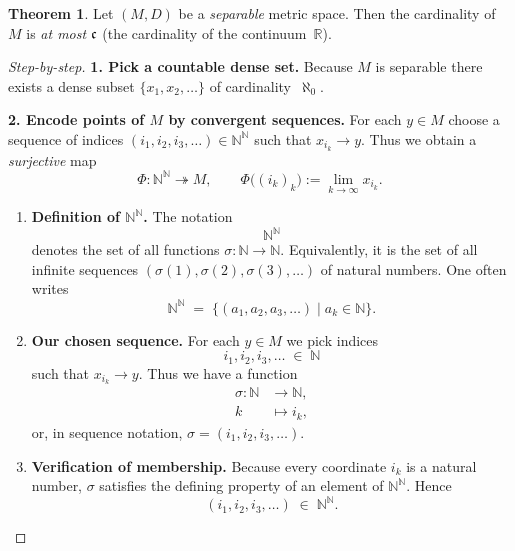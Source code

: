 \documentclass[12pt]{article}
\theoremstyle{definition} %
\newtheorem{theorem}{Theorem}
\theoremstyle{plain} %
\begin{document}
\begin{theorem}\label{thm:card_separable}
  Let $(M,D)$ be a \emph{separable} metric space.
  Then the cardinality of $M$ is \emph{at most} $\frak c$
  (the cardinality of the continuum~$\mathbb R$).
\end{theorem}

\begin{proof}[Step-by-step]
  \textbf{1.  Pick a countable dense set.}\;
  Because $M$ is separable there exists a dense subset
  $\{x_1,x_2,\dots\}$ of cardinality~$\aleph_0$.

  \medskip
  \textbf{2.  Encode points of $M$ by convergent sequences.}\;
  For each $y\in M$ choose a sequence of indices
  $(i_1,i_2,i_3,\dots)\in\mathbb N^{\mathbb N}$ such that
  $x_{i_k}\to y$.
  Thus we obtain a \emph{surjective} map
  \[
      \Phi:\mathbb N^{\mathbb N}\twoheadrightarrow M,
      \qquad
      \Phi\bigl((i_k)_{k}\bigr):=\lim_{k\to\infty}x_{i_k}.
  \]

\begin{enumerate}
  \item \textbf{Definition of \(\mathbb N^{\mathbb N}\).}  
        The notation 
        \[
             \mathbb N^{\mathbb N}
        \]
        denotes the set of all functions
        \(\sigma:\mathbb N\longrightarrow\mathbb N\).  
        Equivalently, it is the set of all infinite sequences 
        \((\sigma(1),\sigma(2),\sigma(3),\dots)\) of natural numbers.  
        One often writes
        \[
            \mathbb N^{\mathbb N}
            \;=\;
            \bigl\{(a_1,a_2,a_3,\dots)\mid a_k\in\mathbb N\bigr\}.
        \]

  \item \textbf{Our chosen sequence.}  
        For each \(y\in M\) we pick indices
        \[
            i_1,i_2,i_3,\dots \;\in\; \mathbb N
        \]
        such that \(x_{i_k}\to y\).  
        Thus we have a function
        \[
            \begin{aligned}
                \sigma:\mathbb N &\longrightarrow \mathbb N,\\
                k &\longmapsto i_k,
            \end{aligned}
        \]
        or, in sequence notation, \(\sigma=(i_1,i_2,i_3,\dots)\).

  \item \textbf{Verification of membership.}  
        Because every coordinate \(i_k\) is a natural number,
        \(\sigma\) satisfies the defining property of an element of
        \(\mathbb N^{\mathbb N}\).  
        Hence
        \[
            (i_1,i_2,i_3,\dots)\;\in\;\mathbb N^{\mathbb N}.
        \]


\end{enumerate}
\end{proof}
\end{document}
